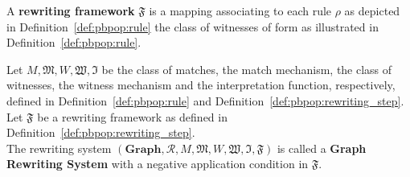     \begin{definition}
      A \pbpop \textbf{rewriting framework} $\mathfrak{F}$ is a mapping associating to each \pbpop rule $\rho$ as depicted in Definition~\ref{def:pbpop:rule} 
       the class of \pbpop witnesses of form as illustrated in Definition~\ref{def:pbpop:rule}.
    \end{definition}

    
    \begin{definition}
      Let $M, \mathfrak{M}, W, \mathfrak{W}, \mathfrak{I}$ be the class of \pbpop matches, the match mechanism, the class of \pbpop witnesses, the witness mechanism and the interpretation function, respectively, defined in Definition~\ref{def:pbpop:rule} and Definition~\ref{def:pbpop:rewriting_step}.
      \\
      Let $\mathfrak{F}$ be a \pbpop rewriting framework as defined in Definition~\ref{def:pbpop:rewriting_step}.
      \\
      The rewriting system $(\mathbf{Graph}, \mathcal{R}, M, \mathfrak{M}, W, \mathfrak{W}, \mathfrak{I}, \mathfrak{F})$ is called a \textbf{\pbpop Graph Rewriting System} with a negative application condition in $\mathfrak{F}$.
    \end{definition}
    
